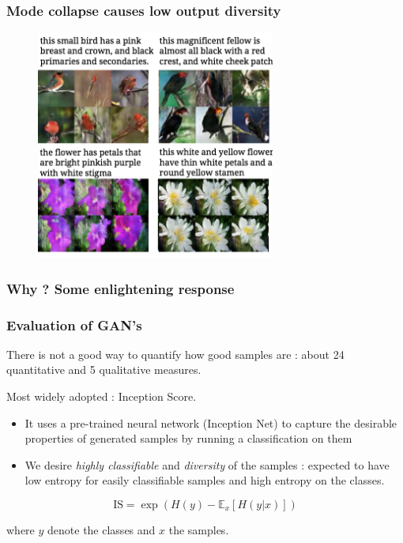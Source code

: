 \documentclass[french,9pt]{beamer}
\begin{document}
\begin{frame}
\frametitle{Mode collapse causes low output diversity}
 \begin{figure}
  \begin{center}
    \includegraphics[width=0.7\textwidth]{fig/diversity}
  \end{center}
\end{figure}
\end{frame}





\begin{frame}
\frametitle{Why ? Some enlightening response \cite{arjovsky_towards_2017}}
\end{frame}

\begin{frame}
\frametitle{Evaluation of GAN's}


There is not a good way to quantify how good samples are : about 24 quantitative and 5 qualitative measures.

Most widely adopted : Inception Score. 
\begin{itemize}
\item It uses a pre-trained neural network (Inception Net) to capture the desirable properties of generated samples by running a classification on them 
\item We desire \emph{highly classifiable} and \emph{diversity} of the samples : expected to have low entropy for easily classifiable samples and high entropy on the classes.
\end{itemize}

$$\text{IS}=\exp(H(y)-\mathbb{E}_{x}[H(y|x)])$$

 where $y$ denote the classes and $x$ the samples.


\end{frame}
\end{document}
